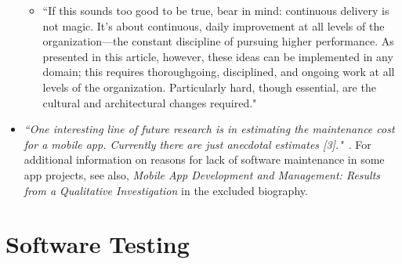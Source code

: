 \begin{itemize}
\begin{itemize}
        \item ``If this sounds too good to be true, bear in mind: continuous delivery is not magic. It's about continuous, daily improvement at all levels of the organization—the constant discipline of pursuing higher performance. As presented in this article, however, these ideas can be implemented in any domain; this requires thoroughgoing, disciplined, and ongoing work at all levels of the organization. Particularly hard, though essential, are the cultural and architectural changes required."
    \end{itemize}
    \item \emph{``One interesting line of future research is in estimating the maintenance cost for a mobile app. Currently there are just anecdotal estimates [3]."}~\citep[p. 27]{nagappan2016_future_trends_in_sw_eng_for_mobile_apps}. For additional information on reasons for lack of software maintenance in some app projects, see also, \emph{Mobile App Development and Management: Results from a Qualitative Investigation} in the excluded biography.
    
\end{itemize}


\section{Software Testing}

